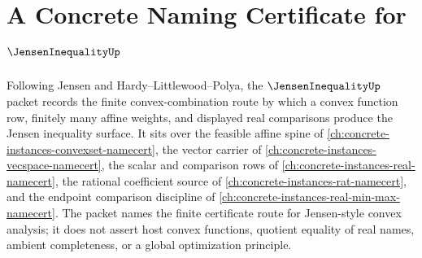 \chapter{A Concrete Naming Certificate for $\JensenInequalityUp$}
\label{ch:concrete-instances-jensen-inequality-namecert}

Following Jensen and Hardy--Littlewood--Polya, the $\JensenInequalityUp$ packet records the finite convex-combination route by which a convex function row, finitely many affine weights, and displayed real comparisons produce the Jensen inequality surface. It sits over the feasible affine spine of \autoref{ch:concrete-instances-convexset-namecert}, the vector carrier of \autoref{ch:concrete-instances-vecspace-namecert}, the scalar and comparison rows of \autoref{ch:concrete-instances-real-namecert}, the rational coefficient source of \autoref{ch:concrete-instances-rat-namecert}, and the endpoint comparison discipline of \autoref{ch:concrete-instances-real-min-max-namecert}. The packet names the finite certificate route for Jensen-style convex analysis; it does not assert host convex functions, quotient equality of real names, ambient completeness, or a global optimization principle.


